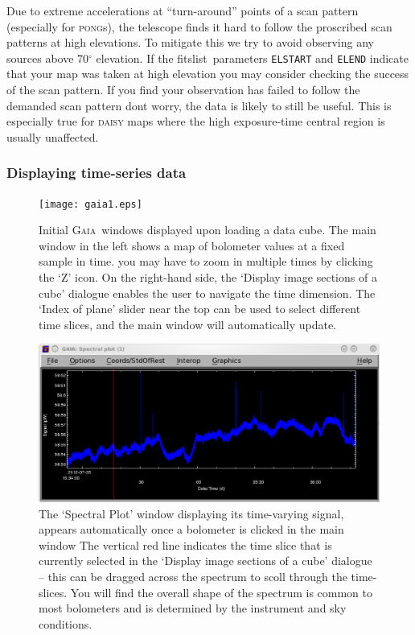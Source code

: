 \documentclass[twoside,11pt]{article}
\newcommand{\xref}[3]{#1}
\newcommand{\xlabel}[1]{}
\renewcommand{\_}{\texttt{\symbol{95}}}
\newcommand{\gaia}{\xref{\textsc{Gaia}}{sun214}{}}
\newcommand{\task}[1]{\textsf{#1}}
\newcommand{\param}[1]{\texttt{#1}}
\newcommand{\fitslist}{\xref{\task{fitslist}}{sun95}{FITSLIST}}
\begin{document}
Due to extreme accelerations at ``turn-around'' points of a scan pattern (especially for  \textsc{pong}s), the telescope finds it hard to follow the proscribed scan patterns at high elevations. To mitigate this we try to avoid observing any sources above 70$^\circ$ elevation. If the \fitslist\ parameters \param{ELSTART} and \param{ELEND} indicate that your map was taken at high elevation you may consider checking the success of the scan pattern. If you find your observation has failed to follow the demanded scan pattern dont worry, the data is likely to still be useful. This is especially true for \textsc{daisy} maps where the high exposure-time central region is usually unaffected.

\subsubsection{\xlabel{display_cube}Displaying time-series data}
\label{sec:gaiacube}
\begin{figure}[h!]
\texttt{[image: gaia1.eps]}
\vspace{1mm}
\caption{\small Initial \gaia\ windows displayed upon loading a data cube. The main window in the left shows a map of bolometer values at a fixed sample in time. you may have to zoom in multiple times by clicking the `Z' icon. On the right-hand side, the  `Display image sections of a cube' dialogue enables the user to  navigate the time dimension. The `Index of plane' slider near the   top can be used to select different time slices, and the main window
  will automatically update.}
\label{fig:gaia_main}
\end{figure}

\begin{figure}[h!]
\centering
\includegraphics[width=0.8\linewidth]{gaia2}
\vspace{0.3cm}
\caption{\small The `Spectral Plot' window displaying its time-varying signal, appears automatically once a bolometer is clicked in the main window The vertical red line  indicates the time slice that is currently selected in the `Display  image sections of a cube' dialogue -- this can be dragged across the spectrum to scoll through the time-slices.  You will find the overall shape of the spectrum is common to most bolometers and is determined by the instrument and sky conditions.}
\label{fig:gaia_spec}
\end{figure}
\end{document}
